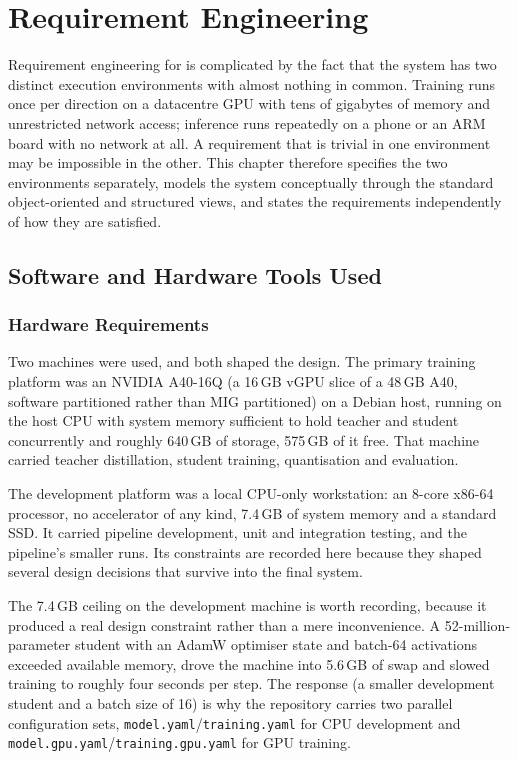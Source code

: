 \chapter{Requirement Engineering}
\label{ch:requirements}

Requirement engineering for \setu{} is complicated by the fact that the system
has two distinct execution environments with almost nothing in common. Training
runs once per direction on a datacentre GPU with tens of gigabytes of memory and
unrestricted network access; inference runs repeatedly on a phone or an ARM
board with no network at all. A requirement that is trivial in one environment
may be impossible in the other. This chapter therefore specifies the two
environments separately, models the system conceptually through the standard
object-oriented and structured views, and states the requirements independently
of how they are satisfied.

\section{Software and Hardware Tools Used}
\label{sec:tools}

\subsection{Hardware Requirements}
\label{subsec:hw}

Two machines were used, and both shaped the design. The primary training
platform was an NVIDIA A40-16Q (a 16\,GB vGPU slice of a 48\,GB A40, software
partitioned rather than MIG partitioned) on a Debian host, running on the host
CPU with system memory sufficient to hold teacher and student concurrently and
roughly 640\,GB of storage, 575\,GB of it free. That machine carried teacher
distillation, student training, quantisation and evaluation.

The development platform was a local CPU-only workstation: an 8-core x86-64
processor, no accelerator of any kind, 7.4\,GB of system memory and a standard
SSD. It carried pipeline development, unit and integration testing, and the
pipeline's smaller runs. Its constraints are recorded here because they shaped
several design decisions that survive into the final system.



The 7.4\,GB ceiling on the development machine is worth recording, because it
produced a real design constraint rather than a mere inconvenience. A
52-million-parameter student with an AdamW optimiser state and batch-64
activations exceeded available memory, drove the machine into 5.6\,GB of swap
and slowed training to roughly four seconds per step. The response (a smaller
development student and a batch size of 16) is why the repository carries two
parallel configuration sets, \texttt{model.yaml}/\texttt{training.yaml} for CPU
development and \texttt{model.gpu.yaml}/\texttt{training.gpu.yaml} for GPU
training.

